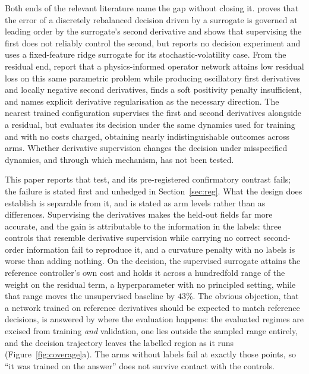 \documentclass{article}
\begin{document}
Both ends of the relevant literature name the gap without closing it.
\citet{noguer2026derivative} proves that the error of a discretely rebalanced
decision driven by a surrogate is governed at leading order by the surrogate's
second derivative and shows that supervising the first does not reliably control the
second, but reports no decision experiment and uses a fixed-feature ridge surrogate
for its stochastic-volatility case. From the residual end,
\citet{chakhoyan2025deepsvm} report that a physics-informed operator network attains
low residual loss on this same parametric problem while producing oscillatory first
derivatives and locally negative second derivatives, finds a soft positivity penalty
insufficient, and names explicit derivative regularisation as the necessary
direction. The nearest trained configuration \citep{sakuma2026a} supervises the
first and second derivatives alongside a residual, but evaluates its decision under
the same dynamics used for training and with no costs charged, obtaining nearly
indistinguishable outcomes across arms. Whether derivative supervision changes the
decision under misspecified dynamics, and through which mechanism, has not been
tested.

This paper reports that test, and its pre-registered confirmatory contrast fails;
the failure is stated first and unhedged in Section~\ref{sec:reg}. What the design
does establish is separable from it, and is stated as arm levels rather than as
differences. Supervising the derivatives makes the held-out fields far more
accurate, and the gain is attributable to the information in the labels: three
controls that resemble derivative supervision while carrying no correct second-order
information fail to reproduce it, and a curvature penalty with no labels is worse
than adding nothing. On the decision, the supervised surrogate attains the reference controller's own
cost and holds it across a hundredfold range of the weight on the residual term, a
hyperparameter with no principled setting, while that range moves the unsupervised
baseline by $43\%$. The obvious objection, that a network trained on reference
derivatives should be expected to match reference decisions, is answered by where
the evaluation happens: the evaluated regimes are excised from training \emph{and}
validation, one lies outside the sampled range entirely, and the decision trajectory
leaves the labelled region as it runs (Figure~\ref{fig:coverage}a). The arms without
labels fail at exactly those points, so ``it was trained on the answer'' does not
survive contact with the controls.
\end{document}
